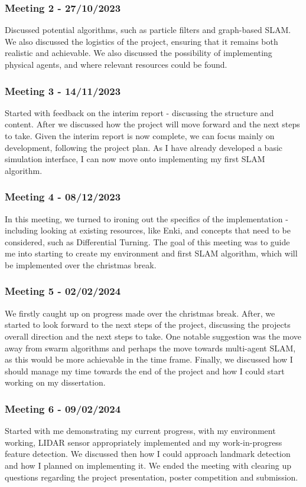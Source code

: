 \documentclass[12pt]{article}
\begin{document}
\subsubsection{Meeting 2 - 27/10/2023}
Discussed potential algorithms, such as particle filters and graph-based SLAM. We also discussed the logistics of the project,
ensuring that it remains both realistic and achievable. We also discussed the possibility of implementing physical agents,
and where relevant resources could be found.
\subsubsection{Meeting 3 - 14/11/2023}
Started with feedback on the interim report - discussing the structure and content. After we discussed how the project will
move forward and the next steps to take. Given the interim report is now complete, we can focus mainly on development, following
the project plan. As I have already developed a basic simulation interface, I can now move onto implementing my first SLAM algorithm.
\subsubsection{Meeting 4 - 08/12/2023}
In this meeting, we turned to ironing out the specifics of the implementation - including looking at existing resources, like
Enki, and concepts that need to be considered, such as Differential Turning. The goal of this meeting was to guide me into
starting to create my environment and first SLAM algorithm, which will be implemented over the christmas break.
\subsubsection{Meeting 5 - 02/02/2024}
We firstly caught up on progress made over the christmas break. After, we started to look forward to the next steps of the project,
discussing the projects overall direction and the next steps to take. One notable suggestion was the move away from swarm algorithms
and perhaps the move towards multi-agent SLAM, as this would be more achievable in the time frame. Finally, we discussed how I
should manage my time towards the end of the project and how I could start working on my dissertation.
\subsubsection{Meeting 6 - 09/02/2024}
Started with me demonstrating my current progress, with my environment working, LIDAR sensor appropriately implemented and
my work-in-progress feature detection. We discussed then how I could approach landmark detection and how I planned on implementing
it. We ended the meeting with clearing up questions regarding the project presentation, poster competition and submission.
\end{document}
